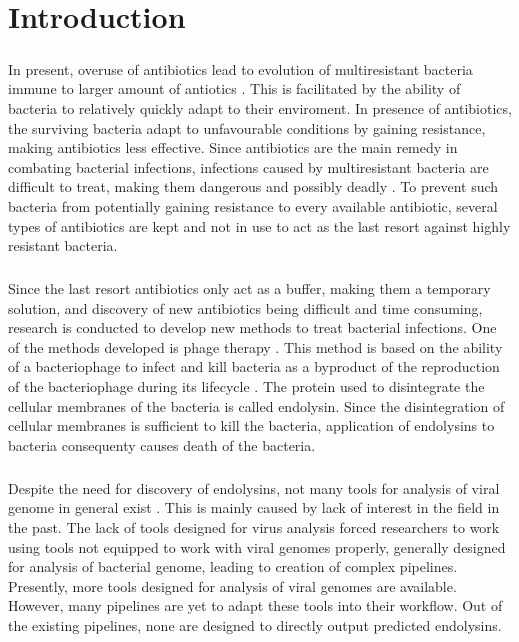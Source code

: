 \chapter*{Introduction} %

\paragraph*{}
In present, overuse of antibiotics lead to evolution of multiresistant bacteria immune to larger amount of antiotics \cite{nikaido2009multidrug}. This is facilitated by the ability of bacteria to relatively quickly adapt to their enviroment. In presence of antibiotics, the surviving bacteria adapt to unfavourable conditions by gaining resistance, making antibiotics less effective. Since antibiotics are the main remedy in combating bacterial infections, infections caused by multiresistant bacteria are difficult to treat, making them dangerous and possibly deadly \cite{mckenna2013last}. To prevent such bacteria from potentially gaining resistance to every available antibiotic, several types of antibiotics are kept and not in use to act as the last resort against highly resistant bacteria.
\paragraph*{}
Since the last resort antibiotics only act as a buffer, making them a temporary solution, and discovery of new antibiotics being difficult and time consuming, research is conducted to develop new methods to treat bacterial infections. One of the methods developed is phage therapy \cite{vandenheuvel2015bacteriophage}. This method is based on the ability of a bacteriophage to infect and kill bacteria as a byproduct of the reproduction of the bacteriophage during its lifecycle \cite{gordillo2019phage}. The protein used to disintegrate the cellular membranes of the bacteria is called endolysin. Since the disintegration of cellular membranes is sufficient to kill the bacteria, application of endolysins to bacteria consequenty causes death of the bacteria. 
\paragraph*{}
Despite the need for discovery of endolysins, not many tools for analysis of viral genome in general exist \cite{clokie2009bacteriophages}. This is mainly caused by lack of interest in the field in the past. The lack of tools designed for virus analysis forced researchers to work using tools not equipped to work with viral genomes properly, generally designed for analysis of bacterial genome, leading to creation of complex pipelines. Presently, more tools designed for analysis of viral genomes are available. However, many pipelines are yet to adapt these tools into their workflow. Out of the existing pipelines, none are designed to directly output predicted endolysins.
